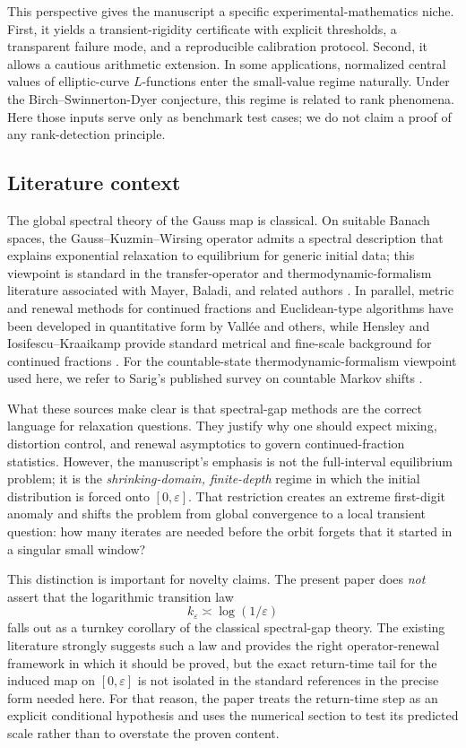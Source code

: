\documentclass[11pt]{article}
\begin{document}
This perspective gives the manuscript a specific experimental-mathematics niche. First, it yields a transient-rigidity certificate with explicit thresholds, a transparent failure mode, and a reproducible calibration protocol. Second, it allows a cautious arithmetic extension. In some applications, normalized central values of elliptic-curve $L$-functions enter the small-value regime naturally. Under the Birch--Swinnerton-Dyer conjecture, this regime is related to rank phenomena. Here those inputs serve only as benchmark test cases; we do not claim a proof of any rank-detection principle.

\subsection{Literature context}

The global spectral theory of the Gauss map is classical. On suitable Banach spaces, the Gauss--Kuzmin--Wirsing operator admits a spectral description that explains exponential relaxation to equilibrium for generic initial data; this viewpoint is standard in the transfer-operator and thermodynamic-formalism literature associated with Mayer, Baladi, and related authors \cite{Mayer1978,Baladi2000}. In parallel, metric and renewal methods for continued fractions and Euclidean-type algorithms have been developed in quantitative form by Vall\'ee and others, while Hensley and Iosifescu--Kraaikamp provide standard metrical and fine-scale background for continued fractions \cite{Vallee1998,Hensley2006,Iosifescu2002}. For the countable-state thermodynamic-formalism viewpoint used here, we refer to Sarig's published survey on countable Markov shifts \cite{Sarig2015}.

What these sources make clear is that spectral-gap methods are the correct language for relaxation questions. They justify why one should expect mixing, distortion control, and renewal asymptotics to govern continued-fraction statistics. However, the manuscript's emphasis is not the full-interval equilibrium problem; it is the \emph{shrinking-domain, finite-depth} regime in which the initial distribution is forced onto $[0,\varepsilon]$. That restriction creates an extreme first-digit anomaly and shifts the problem from global convergence to a local transient question: how many iterates are needed before the orbit forgets that it started in a singular small window?

This distinction is important for novelty claims. The present paper does \emph{not} assert that the logarithmic transition law
\[
k_{\varepsilon} \asymp \log(1/\varepsilon)
\]
falls out as a turnkey corollary of the classical spectral-gap theory. The existing literature strongly suggests such a law and provides the right operator-renewal framework in which it should be proved, but the exact return-time tail for the induced map on $[0,\varepsilon]$ is not isolated in the standard references in the precise form needed here. For that reason, the paper treats the return-time step as an explicit conditional hypothesis and uses the numerical section to test its predicted scale rather than to overstate the proven content.
\end{document}
